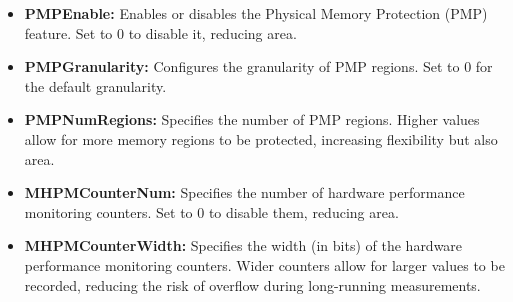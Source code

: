 \documentclass{article}
\begin{document}
\begin{itemize}
    \item \textbf{PMPEnable:} Enables or disables the Physical Memory Protection (PMP) feature. Set to 0 to disable it, reducing area.
    \item \textbf{PMPGranularity:} Configures the granularity of PMP regions. Set to 0 for the default granularity.
    \item \textbf{PMPNumRegions:} Specifies the number of PMP regions. Higher values allow for more memory regions to be protected, increasing flexibility but also area.
    \item \textbf{MHPMCounterNum:} Specifies the number of hardware performance monitoring counters. Set to 0 to disable them, reducing area.
    \item \textbf{MHPMCounterWidth:} Specifies the width (in bits) of the hardware performance monitoring counters. Wider counters allow for larger values to be recorded, reducing the risk of overflow during long-running measurements.
\end{itemize}
\end{document}
